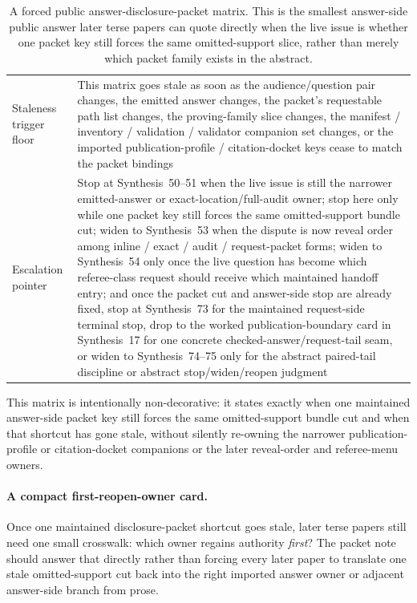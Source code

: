 \documentclass[11pt]{article}
\begin{document}
\begin{table}[t]
\begin{tabularx}{\linewidth}{@{}lX@{}}
Staleness trigger floor & This matrix goes stale as soon as the audience/question pair changes, the emitted answer changes, the packet's requestable path list changes, the proving-family slice changes, the manifest / inventory / validation / validator companion set changes, or the imported publication-profile / citation-docket keys cease to match the packet bindings \\
Escalation pointer & Stop at Synthesis~50--51 when the live issue is still the narrower emitted-answer or exact-location/full-audit owner; stop here only while one packet key still forces the same omitted-support bundle cut; widen to Synthesis~53 when the dispute is now reveal order among inline / exact / audit / request-packet forms; widen to Synthesis~54 only once the live question has become which referee-class request should receive which maintained handoff entry; and once the packet cut and answer-side stop are already fixed, stop at Synthesis~73 for the maintained request-side terminal stop, drop to the worked publication-boundary card in Synthesis~17 for one concrete checked-answer/request-tail seam, or widen to Synthesis~74--75 only for the abstract paired-tail discipline or abstract stop/widen/reopen judgment \\
\bottomrule
\end{tabularx}
\caption{A forced public answer-disclosure-packet matrix. This is the smallest answer-side public answer later terse papers can quote directly when the live issue is whether one packet key still forces the same omitted-support slice, rather than merely which packet family exists in the abstract.}
\label{tab:forced-public-answer-disclosure-packet-matrix}
\end{table}

This matrix is intentionally non-decorative: it states exactly when one maintained answer-side packet key still forces the same omitted-support bundle cut and when that shortcut has gone stale, without silently re-owning the narrower publication-profile or citation-docket companions or the later reveal-order and referee-menu owners.\cite{series:workedexample}

\paragraph{A compact first-reopen-owner card.}
Once one maintained disclosure-packet shortcut goes stale, later terse papers still need one small crosswalk: which owner regains authority \emph{first}? The packet note should answer that directly rather than forcing every later paper to translate one stale omitted-support cut back into the right imported answer owner or adjacent answer-side branch from prose.
\end{document}
